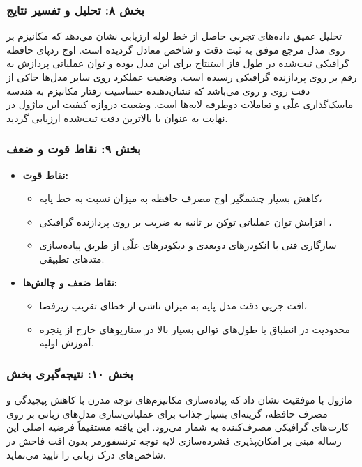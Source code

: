 \subsubsection*{بخش ۸: تحلیل و تفسیر نتایج }
تحلیل عمیق داده‌های تجربی حاصل از خط لوله ارزیابی نشان می‌دهد که مکانیزم  بر روی مدل مرجع  موفق به ثبت دقت  و شاخص  معادل  گردیده است. اوج ردپای حافظه گرافیکی ثبت‌شده در طول فاز استنتاج برای این مدل  بوده و توان عملیاتی پردازش به رقم  بر روی پردازنده گرافیکی  رسیده است. وضعیت عملکرد روی سایر مدل‌ها حاکی از دقت  روی  و  روی  می‌باشد که نشان‌دهنده حساسیت رفتار مکانیزم به هندسه ماسک‌گذاری علّی و تعاملات دوطرفه لایه‌ها است. وضعیت دروازه کیفیت این ماژول در نهایت به عنوان  با بالاترین دقت ثبت‌شده  ارزیابی گردید.

\subsubsection*{بخش ۹: نقاط قوت و ضعف }
\begin{itemize}
    \item \textbf{نقاط قوت:}
    \begin{itemize}
        \item کاهش بسیار چشمگیر اوج مصرف حافظه به میزان  نسبت به خط پایه،
        \item افزایش توان عملیاتی توکن بر ثانیه به ضریب  بر روی پردازنده گرافیکی ،
        \item سازگاری فنی با انکودرهای دوبعدی و دیکودرهای علّی از طریق پیاده‌سازی متدهای تطبیقی.
    \end{itemize}
    \item \textbf{نقاط ضعف و چالش‌ها:}
    \begin{itemize}
        \item افت جزیی دقت مدل پایه به میزان  ناشی از خطای تقریب زیرفضا،
        \item محدودیت در انطباق با طول‌های توالی بسیار بالا در سناریوهای خارج از پنجره آموزش اولیه.
    \end{itemize}
\end{itemize}

\subsubsection*{بخش ۱۰: نتیجه‌گیری بخش }
ماژول  با موفقیت نشان داد که پیاده‌سازی مکانیزم‌های توجه مدرن با کاهش پیچیدگی و مصرف حافظه، گزینه‌ای بسیار جذاب برای عملیاتی‌سازی مدل‌های زبانی بر روی کارت‌های گرافیکی مصرف‌کننده  به شمار می‌رود. این یافته مستقیماً فرضیه اصلی این رساله مبنی بر امکان‌پذیری فشرده‌سازی لایه توجه ترنسفورمر بدون افت فاحش در شاخص‌های درک زبانی را تایید می‌نماید.

